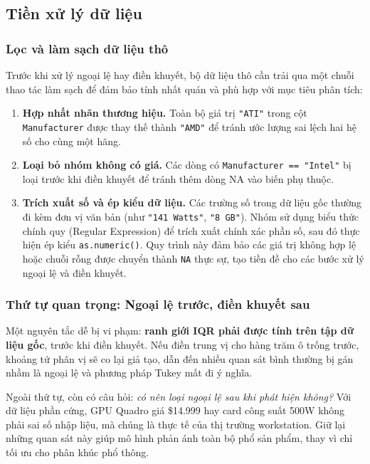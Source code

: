 \documentclass[a4paper]{article}
\begin{document}
\subsection{Tiền xử lý dữ liệu}

\subsubsection{Lọc và làm sạch dữ liệu thô}

Trước khi xử lý ngoại lệ hay điền khuyết, bộ dữ liệu thô cần trải qua một chuỗi thao tác làm sạch để đảm bảo tính nhất quán và phù hợp với mục tiêu phân tích:

\begin{enumerate}
  \item \textbf{Hợp nhất nhãn thương hiệu.} Toàn bộ giá trị \texttt{"ATI"} trong cột \texttt{Manufacturer} được thay thế thành \texttt{"AMD"} để tránh ước lượng sai lệch hai hệ số cho cùng một hãng.

  \item \textbf{Loại bỏ nhóm không có giá.} Các dòng có \texttt{Manufacturer == "Intel"} bị loại trước khi điền khuyết để tránh thêm dòng NA vào biến phụ thuộc.

  \item \textbf{Trích xuất số và ép kiểu dữ liệu.} Các trường số trong dữ liệu gốc thường đi kèm đơn vị văn bản (như \texttt{"141 Watts"}, \texttt{"8 GB"}). Nhóm sử dụng biểu thức chính quy (Regular Expression) để trích xuất chính xác phần số, sau đó thực hiện ép kiểu \texttt{as.numeric()}. Quy trình này đảm bảo các giá trị không hợp lệ hoặc chuỗi rỗng được chuyển thành \texttt{NA} thực sự, tạo tiền đề cho các bước xử lý ngoại lệ và điền khuyết.
\end{enumerate}

\subsubsection{Thứ tự quan trọng: Ngoại lệ trước, điền khuyết sau}

Một nguyên tắc dễ bị vi phạm: \textbf{ranh giới IQR phải được tính trên tập dữ liệu gốc}, trước khi điền khuyết. Nếu điền trung vị cho hàng trăm ô trống trước, khoảng tứ phân vị sẽ co lại giả tạo, dẫn đến nhiều quan sát bình thường bị gán nhầm là ngoại lệ và phương pháp Tukey mất đi ý nghĩa.

Ngoài thứ tự, còn có câu hỏi: \textit{có nên loại ngoại lệ sau khi phát hiện không?} Với dữ liệu phần cứng, GPU Quadro giá \$14.999 hay card công suất 500W không phải sai số nhập liệu, mà chúng là thực tế của thị trường workstation. Giữ lại những quan sát này giúp mô hình phản ánh toàn bộ phổ sản phẩm, thay vì chỉ tối ưu cho phân khúc phổ thông.
\end{document}
